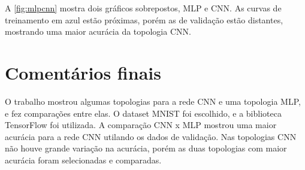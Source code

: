 \documentclass[sigconf, nonacm, screen]{acmart}
\begin{document}
A \autoref{fig:mlpcnn} mostra dois gráficos sobrepostos, MLP e CNN. As curvas de treinamento em azul estão próximas, porém as de validação estão distantes, mostrando uma maior acurácia da topologia CNN.


\section{Comentários finais}
\label{sec:conclusao}

O trabalho mostrou algumas topologias para a rede CNN e uma topologia MLP, e fez comparações entre elas. O dataset MNIST foi escolhido, e a biblioteca TensorFlow foi utilizada. A comparação CNN x MLP mostrou uma maior acurácia para a rede CNN utilando os dados de validação. Nas topologias CNN não houve grande variação na acurácia, porém as duas topologias com maior acurácia foram selecionadas e comparadas.





\balance
\nocite{*}


\label{chp:bibl}
\end{document}
